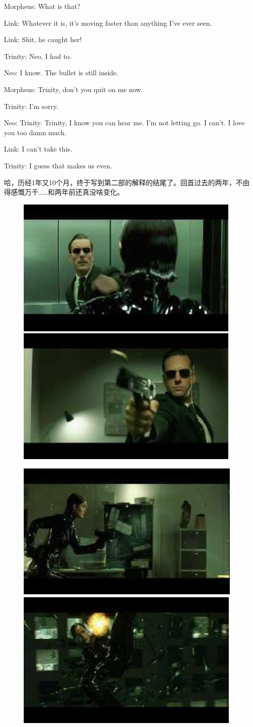 \documentclass[UTF8]{ctexart}
\newenvironment{myquote}{\color{green} \setlength{\leftskip}{6em} \setlength{\rightskip}{4em} \setlength{\parindent}{-2em}}{\par}
\begin{document}
\begin{myquote}
Morpheus: What is that?

Link: Whatever it is, it's moving faster than anything I've ever seen.

Link: Shit, he caught her!

Trinity: Neo, I had to.

Neo: I know. The bullet is still inside.

Morpheus: Trinity, don't you quit on me now.

Trinity: I'm sorry.

Neo: Trinity. Trinity, I know you can hear me. I'm not letting go. I can't. I love you too damn much.

Link: I can't take this.

Trinity: I guess that makes us even.
\end{myquote}

哈，历经1年又10个月，终于写到第二部的解释的结尾了。回首过去的两年，不由得感慨万千……和两年前还真没啥变化。

\begin{figure}[htb]
\centering
\includegraphics[width=0.45\linewidth]{fig/read_reloaded-170}
\includegraphics[width=0.45\linewidth]{fig/read_reloaded-170-1}

\vspace{3pt}

\includegraphics[width=0.45\linewidth]{fig/read_reloaded-170-2}
\includegraphics[width=0.45\linewidth]{fig/read_reloaded-170-3}
\end{figure}
\end{document}
